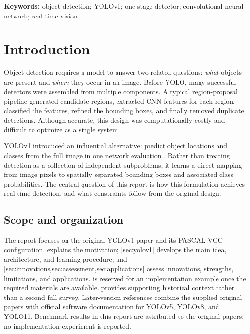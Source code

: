 \documentclass[11pt,a4paper]{article}
\begin{document}
\noindent\textbf{Keywords:} object detection; YOLOv1; one-stage detector; convolutional neural network; real-time vision

\begingroup
\small{}
\tableofcontents
\endgroup
\clearpage

\section{Introduction}
Object detection requires a model to answer two related questions: \emph{what} objects are present and \emph{where} they occur in an image. Before YOLO, many successful detectors were assembled from multiple components. A typical region-proposal pipeline generated candidate regions, extracted CNN features for each region, classified the features, refined the bounding boxes, and finally removed duplicate detections. Although accurate, this design was computationally costly and difficult to optimize as a single system \cite{redmon2016yolo,rcnn2014,fastrcnn2015}.

YOLOv1 introduced an influential alternative: predict object locations and classes from the full image in one network evaluation \cite{redmon2016yolo}. Rather than treating detection as a collection of independent subproblems, it learns a direct mapping from image pixels to spatially separated bounding boxes and associated class probabilities. The central question of this report is how this formulation achieves real-time detection, and what constraints follow from the original design.

\subsection{Scope and organization}
The report focuses on the original YOLOv1 paper and its PASCAL VOC configuration.  explains the motivation; \cref{sec:yolov1} develops the main idea, architecture, and learning procedure; and \cref{sec:innovations,sec:assessment,sec:applications} assess innovations, strengths, limitations, and applications.  is reserved for an implementation example once the required materials are available.  provides supporting historical context rather than a second full survey. Later-version references combine the supplied original papers with official software documentation for YOLOv5, YOLOv8, and YOLO11. Benchmark results in this report are attributed to the original papers; no implementation experiment is reported.
\end{document}
